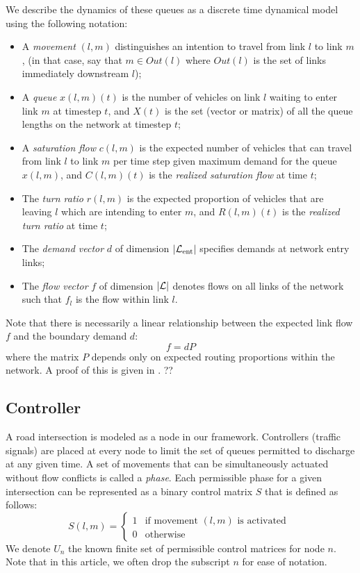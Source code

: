We describe the dynamics of these queues as a discrete time dynamical model using the following notation: 
\begin{itemize}
\item A \emph{movement} $(l,m)$ distinguishes an intention to travel from link $l$ to link $m$,
(in that case, say that $m \in Out(l)$ where $Out(l)$ is the set of links immediately downstream $l$);
\item A \emph{queue} $x(l,m)(t)$ is the number of vehicles on link $l$ waiting to enter link $m$ at timestep $t$, and $X(t)$ is the set (vector or matrix) of all the queue lengths on the network at timestep $t$;
\item A \emph{saturation flow} $c(l,m)$ is the expected number of vehicles that can travel from link $l$ to link $m$ per time step given maximum demand for the queue $x(l,m)$, and $C(l,m)(t)$ is the \emph{realized saturation flow} at time $t$; 
\item The \emph{turn ratio} $r(l,m)$ is the expected proportion of vehicles that are leaving $l$ which are intending to enter $m$, and $R(l,m)(t)$ is the \emph{realized turn ratio} at time $t$;
\item The \emph{demand vector} $d$ of dimension $|\mathcal{L}_{\text{ent}}|$ specifies demands at network entry links;
\item The \emph{flow vector} $f$ of dimension $|\mathcal{L}|$ denotes flows on all links of the network such that $f_{l}$ is the flow within link $l$. 
\end{itemize}
Note that there is necessarily a linear relationship between the expected link flow $f$ and the boundary demand $d$: 
\begin{equation} \label{fd_relation}
f=dP
\end{equation}
where the matrix $P$ depends only on expected routing proportions within the network. {\color{red} A proof of this is given in \cite{MaxPressureStochastic}. ?? }



\subsection*{Controller}

A road intersection is modeled as a node in our framework. Controllers (traffic signals) are placed at every node to limit the set of queues permitted to discharge at any given time. A set of movements that can be simultaneously actuated without flow conflicts is called a \emph{phase}.  Each permissible phase for a given intersection can be represented as a binary control matrix $S$ that is defined as follows: 
\begin{equation}
S(l,m) = \begin{cases}
        1 & \text{if movement $(l,m)$ is activated }  \\
        0 & \mbox{otherwise}
    \end{cases}
\end{equation}
We denote $U_n$ the known finite set of permissible control matrices for node $n$. Note that in this article, we often drop the subscript $n$ for ease of notation. 

